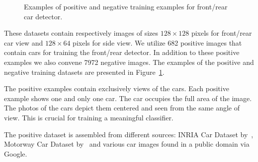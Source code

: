 \begin{figure}[b]
\hspace{2mm}
\hspace{2mm}
\hspace{2mm}
\hspace{2mm}
\caption{Examples of positive and negative training examples for front/rear car detector.}
\label{fig:pos_neg_examples}
\end{figure}

These datasets contain respectively images of sizes $128 \times 128$ pixels
for front/rear car view and $128 \times 64$ pixels for side view. We utilize
682 positive images that contain cars for training the front/rear detector. In
addition to these positive examples we also convene 7972 negative images. The
examples of the positive and negative training datasets are presented in
Figure~\ref{fig:pos_neg_examples}.

The positive examples contain exclusively views of the cars. Each positive
example shows one and only one car. The car occupies the full area of the
image. The photos of the cars depict them centered and seen from the same
angle of view. This is crucial for training a meaningful classifier.

The positive dataset is assembled from different sources: INRIA Car Dataset
by~\citet{inriadata}, Motorway Car Dataset by~\citet{TMEMotorwayDataset} and
various car images found in a public domain via Google.

